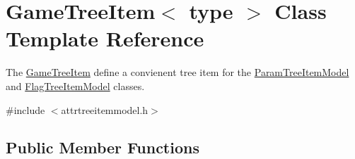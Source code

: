 \hypertarget{class_game_tree_item}{\section{\-Game\-Tree\-Item$<$ type $>$ \-Class \-Template \-Reference}
\label{class_game_tree_item}
}


\-The \hyperlink{class_game_tree_item}{\-Game\-Tree\-Item} define a convienent tree item for the \hyperlink{class_param_tree_item_model}{\-Param\-Tree\-Item\-Model} and \hyperlink{class_flag_tree_item_model}{\-Flag\-Tree\-Item\-Model} classes.  




{\ttfamily \#include $<$attrtreeitemmodel.\-h$>$}

\subsection*{\-Public \-Member \-Functions}
